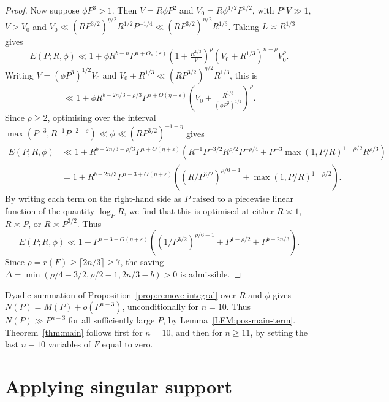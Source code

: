 \documentclass[a4paper,11pt, twoside,reqno]{amsart}
\theoremstyle{plain}
\theoremstyle{definition}
\theoremstyle{remark}
\newcommand{\ve}{\varepsilon}
\renewcommand{\ge}{\geqslant}
\numberwithin{equation}{section}
\begin{document}
\begin{proof}
Now suppose $\phi P^3>1$.
Then $V=R\phi P^2$ and
$V_0=R\phi^{1/2}P^{1/2}$,
with $P^\ve V\gg 1$,
$V>V_0$
and $V_0 \ll (RP^{3/2})^{\eta/2} R^{1/2} P^{-1/4} \ll (RP^{3/2})^{\eta/2} R^{1/3}$.
Taking $L \asymp R^{1/3}$ gives
\begin{equation*}
E(P;R,\phi) \ll 1 + \phi R^{b-n} P^{n+O_n(\ve)}  
(1+\tfrac{R^{1/3}}{V})^\rho (V_0+R^{1/3})^{n-\rho} V_0^\rho.
\end{equation*}
Writing $V = (\phi P^3)^{1/2}V_0$ and $V_0+R^{1/3} \ll (RP^{3/2})^{\eta/2} R^{1/3}$, this is
\begin{equation*}
\ll 1 + \phi R^{b-2n/3-\rho/3} P^{n+O(\eta+\ve)}  
(V_0+\tfrac{R^{1/3}}{(\phi P^3)^{1/2}})^\rho.
\end{equation*}
Since $\rho\ge 2$, optimising over the interval $\max(P^{-3}, R^{-1} P^{-2-\ve})
\ll \phi \ll (RP^{3/2})^{-1+\eta}$ gives
\begin{equation*}
\begin{split}
E(P;R,\phi) &\ll 1 + R^{b-2n/3-\rho/3} P^{n+O(\eta+\ve)}  
(R^{-1}P^{-3/2} R^{\rho/2}P^{-\rho/4} + P^{-3} \max(1, P/R)^{1 - \rho/2} R^{\rho/3}) \\
&= 1 + R^{b-2n/3} P^{n-3+O(\eta+\ve)}  
((R/P^{3/2})^{\rho/6 - 1} + \max(1, P/R)^{1 - \rho/2}).
\end{split}
\end{equation*}
By writing each term on the right-hand side as
$P$ raised to a piecewise linear function of the quantity $\log_P R$,
we find that this is optimised at either $R\asymp 1$, $R\asymp P$, or $R\asymp P^{3/2}$.
Thus
\begin{equation*}
E(P;R,\phi) \ll 1 + P^{n-3+O(\eta+\ve)}  
((1/P^{3/2})^{\rho/6 - 1} + P^{1 - \rho/2} + P^{b-2n/3}).
\end{equation*}
Since $\rho = r(F)\ge \lceil 2n/3\rceil \ge 7$,
the saving $\Delta = \min(\rho/4-3/2, \rho/2-1, 2n/3-b) > 0$ is admissible.
\end{proof}

Dyadic summation of Proposition~\ref{prop:remove-integral}
over $R$ and $\phi$
gives $N(P) = M(P) + o(P^{n-3})$,
unconditionally for $n=10$.
Thus $N(P) \gg P^{n-3}$ for all sufficiently large $P$,
by Lemma~\ref{LEM:pos-main-term}.
Theorem~\ref{thm:main}
follows first for $n=10$,
and then for $n\ge 11$,
by setting the last $n-10$ variables of $F$
equal to zero.

\appendix
\section{Applying singular support}
\label{sec:n10-singular-support}
\end{document}
